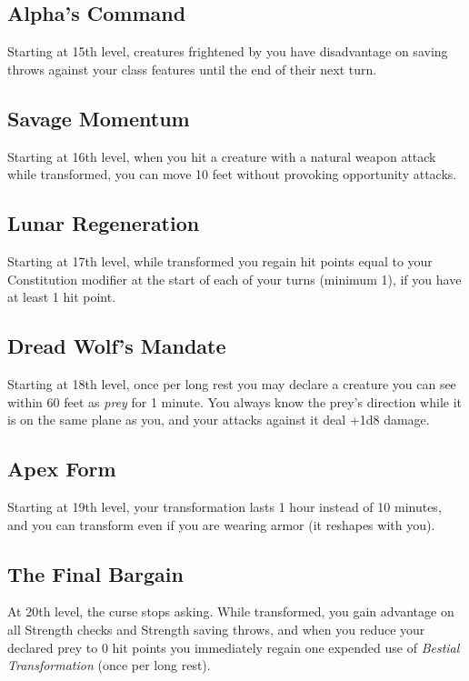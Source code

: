 \documentclass[letterpaper,twocolumn,openany,nodeprecatedcode,breakable,skins,xparse,most]{dndbook}
\begin{document}
\subsection*{Alpha's Command}
Starting at 15th level, creatures frightened by you have disadvantage on saving throws against your class features until the end of their next turn.

\subsection*{Savage Momentum}
Starting at 16th level, when you hit a creature with a natural weapon attack while transformed, you can move 10 feet without provoking opportunity attacks.

\subsection*{Lunar Regeneration}
Starting at 17th level, while transformed you regain hit points equal to your Constitution modifier at the start of each of your turns (minimum 1), if you have at least 1 hit point.

\subsection*{Dread Wolf's Mandate}
Starting at 18th level, once per long rest you may declare a creature you can see within 60 feet as \emph{prey} for 1 minute. You always know the prey's direction while it is on the same plane as you, and your attacks against it deal +1d8 damage.

\subsection*{Apex Form}
Starting at 19th level, your transformation lasts 1 hour instead of 10 minutes, and you can transform even if you are wearing armor (it reshapes with you).

\subsection*{The Final Bargain}
At 20th level, the curse stops asking. While transformed, you gain advantage on all Strength checks and Strength saving throws, and when you reduce your declared prey to 0 hit points you immediately regain one expended use of \emph{Bestial Transformation} (once per long rest).

\newpage
\end{document}
